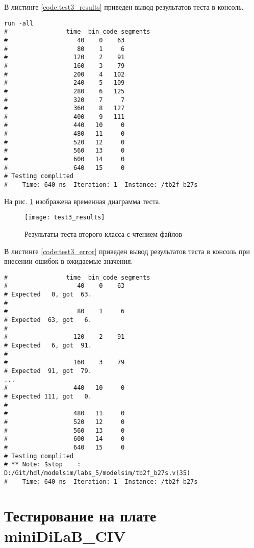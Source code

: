 В листинге \ref{code:test3_results} приведен вывод результатов теста в консоль.
\begin{lstlisting}[caption=Результаты теста второго класса с чтением файлов, label=code:test3_results, language={}]
run -all
# 		         time  bin_code segments
#                   40    0    63
#                   80    1     6
#                  120    2    91
#                  160    3    79
#                  200    4   102
#                  240    5   109
#                  280    6   125
#                  320    7     7
#                  360    8   127
#                  400    9   111
#                  440   10     0
#                  480   11     0
#                  520   12     0
#                  560   13     0
#                  600   14     0
#                  640   15     0
# Testing complited
#    Time: 640 ns  Iteration: 1  Instance: /tb2f_b27s
\end{lstlisting}

На рис. \ref{fig:test3_results} изображена временная диаграмма теста.
\begin{figure}[H]
	\begin{center}
		\texttt{[image: test3\_results]}
		\caption{Результаты теста второго класса с чтением файлов}
		\label{fig:test3_results}
	\end{center}
\end{figure}

В листинге \ref{code:test3_error} приведен вывод результатов теста в консоль при внесении ошибок в ожидаемые значения.
\begin{lstlisting}[caption=Результаты ошибочного теста второго класса с чтением файлов, label=code:test3_error, style=console]
# 		         time  bin_code segments
#                   40    0    63
# Expected   0, got  63.
# 
#                   80    1     6
# Expected  63, got   6.
# 
#                  120    2    91
# Expected   6, got  91.
# 
#                  160    3    79
# Expected  91, got  79.
...
#                  440   10     0
# Expected 111, got   0.
# 
#                  480   11     0
#                  520   12     0
#                  560   13     0
#                  600   14     0
#                  640   15     0
# Testing complited
# ** Note: $stop    : D:/Git/hdl/modelsim/labs_5/modelsim/tb2f_b27s.v(35)
#    Time: 640 ns  Iteration: 1  Instance: /tb2f_b27s
\end{lstlisting}

\section{Тестирование на плате miniDiLaB\_CIV}

